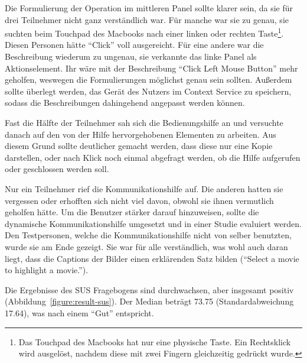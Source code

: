 \documentclass[
	headsepline,
	footsepline,
	fontsize=12pt,
	bibliography=totoc
]{scrbook}
\begin{document}
Die Formulierung der Operation im mittleren Panel sollte klarer sein, da sie für drei Teilnehmer nicht ganz verständlich war. Für manche war sie zu genau, sie suchten beim Touchpad des Macbooks nach einer linken oder rechten Taste\footnote{Das Touchpad des Macbooks hat nur eine physische Taste. Ein Rechtsklick wird ausgelöst, nachdem diese mit zwei Fingern gleichzeitig gedrückt wurde.}. Diesen Personen hätte \enquote{Click} voll ausgereicht. Für eine andere war die Beschreibung wiederum zu ungenau, sie verkannte das linke Panel als Aktionselement. Ihr wäre mit der Beschreibung \enquote{Click Left Mouse Button} mehr geholfen, weswegen die Formulierungen möglichst genau sein sollten. Außerdem sollte überlegt werden, das Gerät des Nutzers im Context Service zu speichern, sodass die Beschreibungen dahingehend angepasst werden können.

Fast die Hälfte der Teilnehmer sah sich die Bedienungshilfe an und versuchte danach auf den von der Hilfe hervorgehobenen Elementen zu arbeiten. Aus diesem Grund sollte deutlicher gemacht werden, dass diese nur eine Kopie darstellen, oder nach Klick noch einmal abgefragt werden, ob die Hilfe aufgerufen oder geschlossen werden soll.


Nur ein Teilnehmer rief die Kommunikationshilfe auf. Die anderen hatten sie vergessen oder erhofften sich nicht viel davon, obwohl sie ihnen vermutlich geholfen hätte. Um die Benutzer stärker darauf hinzuweisen, sollte die dynamische Kommunikationshilfe umgesetzt und in einer Studie evaluiert werden. Den Testpersonen, welche die Kommunikationshilfe nicht von selber benutzten, wurde sie am Ende gezeigt. Sie war für alle verständlich, was wohl auch daran liegt, dass die Captions der Bilder einen erklärenden Satz bilden (\enquote{Select a movie to highlight a movie.}).



Die Ergebnisse des SUS Fragebogens sind durchwachsen, aber insgesamt positiv (Abbildung~\ref{figure:result-sus}). Der Median beträgt 73.75 (Standardabweichung 17.64), was nach \cite{Bangor2009} einem \enquote{Gut} entspricht.
\end{document}
